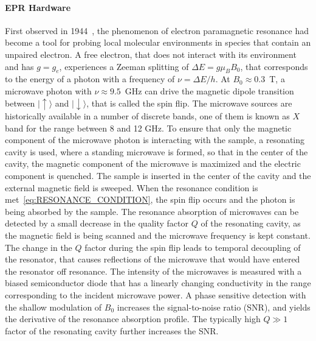 \paragraph{EPR Hardware}
First observed in 1944~\cite{zavoisky_1945}, the phenomenon of electron paramagnetic resonance had become a tool for probing local molecular environments in species that contain an unpaired electron. A free electron, that does not interact with its environment and has $g=g_e$, experiences a Zeeman splitting of $\Delta E = g \mu_B B_0$, that corresponds to the energy of a photon with a frequency of $\nu=\Delta E / h$. At $B_0\approx0.3$~T, a microwave photon with $\nu\approx9.5$~GHz can drive the magnetic dipole transition between $\vert{\uparrow\rangle}$ and $\vert{\downarrow\rangle}$, that is called the spin flip. The microwave sources are historically\cite{RADARS} available in a number of discrete bands, one of them is known as $X$ band for the range between 8 and 12 GHz. To ensure that only the magnetic component of the microwave photon is interacting with the sample, a resonating cavity is used, where a standing microwave is formed, so that in the center of the cavity, the magnetic component of the microwave is maximized and the electric component is quenched. The sample is inserted in the center of the cavity and the external magnetic field is sweeped. When the resonance condition is met~\ref{eq:RESONANCE_CONDITION}, the spin flip occurs and the photon is being absorbed by the sample. The resonance absorption of microwaves can be detected by a small decrease in the quality factor $Q$ of the resonating cavity, as the magnetic field is being scanned and the microwave frequency is kept constant. The change in the $Q$ factor during the spin flip leads to temporal decoupling of the resonator, that causes reflections of the microwave that would have entered the resonator off resonance. The intensity of the microwaves is measured with a biased semiconductor diode that has a linearly changing conductivity in the range corresponding to  the incident microwave power. A phase sensitive detection with the shallow modulation of $B_0$ increases the signal-to-noise ratio (SNR), and yields the derivative of the resonance absorption profile. The typically high $Q\gg1$ factor of the resonating cavity further increases the SNR.


